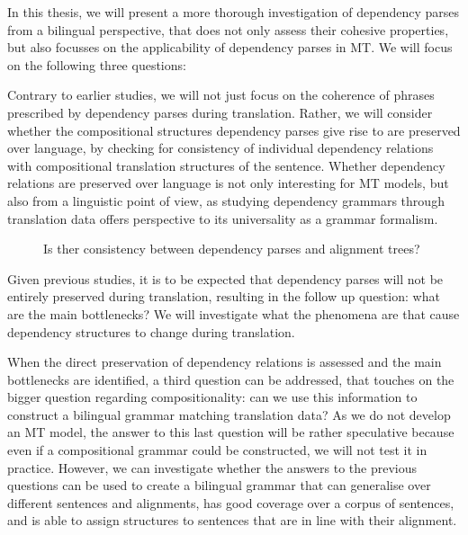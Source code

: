 In this thesis, we will present a more thorough investigation of dependency parses from a bilingual perspective, that does not only assess their cohesive properties, but also focusses on the applicability of dependency parses in MT. We will focus on the following three questions:

Contrary to earlier studies, we will not just focus on the coherence of phrases prescribed by dependency parses during translation. Rather, we will consider whether the compositional structures dependency parses give rise to are preserved over language, by checking for consistency of individual dependency relations with compositional translation structures of the sentence. Whether dependency relations are preserved over language is not only interesting for MT models, but also from a linguistic point of view, as studying dependency grammars through translation data offers perspective to its universality as a grammar formalism.\\

\begin{figure}[!ht]

\centering

\caption{Is ther consistency between dependency parses and alignment trees?}\label{fig:depshats}
\end{figure}

Given previous studies, it is to be expected that dependency parses will not be entirely preserved during translation, resulting in the follow up question: what are the main bottlenecks? We will investigate what the phenomena are that cause dependency structures to change during translation.

When the direct preservation of dependency relations is assessed and the main bottlenecks are identified, a third question can be addressed, that touches on the bigger question regarding compositionality: can we use this information to construct a bilingual grammar matching translation data? As we do not develop an MT model, the answer to this last question will be rather speculative because even if a compositional grammar could be constructed, we will not test it in practice. However, we can investigate whether the answers to the previous questions can be used to create a bilingual grammar that can generalise over different sentences and alignments, has good coverage over a corpus of sentences, and is able to assign structures to sentences that are in line with their alignment.\\

